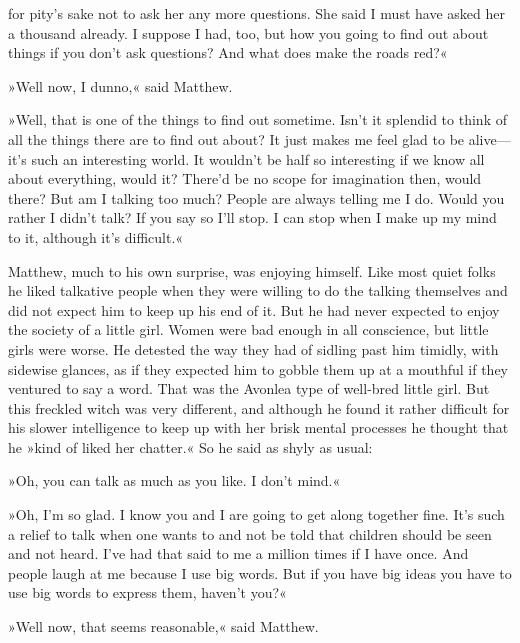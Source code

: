 for pity’s sake not to ask her any more questions. She said I must have asked her a thousand already. I suppose I had, too, but how you going to find out about things if you don’t ask questions? And what does make the roads red?«

»Well now, I dunno,« said Matthew.

»Well, that is one of the things to find out sometime. Isn’t it splendid to think of all the things there are to find out about? It just makes me feel glad to be alive—it’s such an interesting world. It wouldn’t be half so interesting if we know all about everything, would it? There’d be no scope for imagination then, would there? But am I talking too much? People are always telling me I do. Would you rather I didn’t talk? If you say so I’ll stop. I can stop when I make up my mind to it, although it’s difficult.«

Matthew, much to his own surprise, was enjoying himself. Like most quiet folks he liked talkative people when they were willing to do the talking themselves and did not expect him to keep up his end of it. But he had never expected to enjoy the society of a little girl. Women were bad enough in all conscience, but little girls were worse. He detested the way they had of sidling past him timidly, with sidewise glances, as if they expected him to gobble them up at a mouthful if they ventured to say a word. That was the Avonlea type of well-bred little girl. But this freckled witch was very different, and although he found it rather difficult for his slower intelligence to keep up with her brisk mental processes he thought that he »kind of liked her chatter.« So he said as shyly as usual:

»Oh, you can talk as much as you like. I don’t mind.«

»Oh, I’m so glad. I know you and I are going to get along together fine. It’s such a relief to talk when one wants to and not be told that children should be seen and not heard. I’ve had that said to me a million times if I have once. And people laugh at me because I use big words. But if you have big ideas you have to use big words to express them, haven’t you?«

»Well now, that seems reasonable,« said Matthew.

